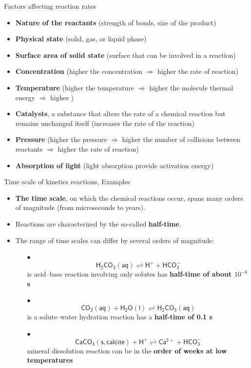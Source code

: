 \begin{frame}[<+->]{Factors affecting reaction rates}
	
	\begin{itemize}
		\item {\bf Nature of the reactants} (strength of bonds, size of the product)
		\item {\bf Physical state} (solid, gas, or liquid phase)
		\item {\bf Surface area of solid state} (surface that can be involved in a reaction)
		\item {\bf Concentration} (higher the concentration $\Rightarrow$ higher the rate of reaction)
		\item {\bf Temperature} (higher the temperature $\Rightarrow$ higher the molecule thermal energy $\Rightarrow$ higher )
		\item {\bf Catalysts}, a substance that alters the rate of a chemical reaction but remains unchanged itself (increases the rate of the reaction)
		\item {\bf Pressure} (higher the pressure $\Rightarrow$ higher the number of collisions between reactants $\Rightarrow$ higher the rate of reaction)
		\item {\bf Absorption of light} (light absorption provide activation energy)
	\end{itemize}
	
\end{frame}
%
%
\begin{frame}[<+->]{Time scale of kinetics reactions, Examples}
	\small
	\begin{itemize}
		\item \textbf{\alert{The time scale}}, on which the chemical reactions occur, spans many orders of magnitude (from microseconds to years).
		\item Reactions are characterized by the so-called  \textbf{\alert{half-time}}.
		\item The range of time scales can differ by several orders of magnitude:
		
		\begin{itemize}
			\item[$\bullet$]
			\[\mathsf{H_2CO_3(aq) \rightleftharpoons H^+ + HCO_3^-}\] 
			is acid–base reaction involving only solutes has \textbf{half-time of about $10^{-6}$ s}
			\item[$\bullet$]
			\[\mathsf{CO_2(aq) + H_2O(l) \rightleftharpoons H_2CO_3(aq)}\] 
			is a solute–water hydration reaction has a \textbf{half-time of 0.1 s}
			
			\item[$\bullet$]
			\[\mathsf{CaCO_3(s, calcite) + H^{+} \rightleftharpoons Ca^{2+} + HCO_3^{-}}\] 
			mineral dissolution reaction can be in the\textbf{ order of weeks at low temperatures}
		\end{itemize}
	\end{itemize}
	
\end{frame}
